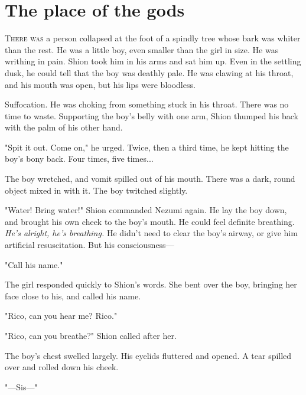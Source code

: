 
\chapter{The place of the gods}


\lettrine{T}{here was} a person collapsed at the foot of a spindly tree whose bark
was whiter than the rest. He was a little boy, even smaller than the
girl in size. He was writhing in pain. Shion took him in his arms and
sat him up. Even in the settling dusk, he could tell that the boy was
deathly pale. He was clawing at his throat, and his mouth was open, but
his lips were bloodless.

\myspace

Suffocation. He was choking from something stuck in his throat. There
was no time to waste. Supporting the boy's belly with one arm, Shion
thumped his back with the palm of his other hand.

"Spit it out. Come on," he urged. Twice, then a third time, he kept
hitting the boy's bony back. Four times, five times...

The boy wretched, and vomit spilled out of his mouth. There was a dark,
round object mixed in with it. The boy twitched slightly.

"Water! Bring water!" Shion commanded Nezumi again. He lay the boy down,
and brought his own cheek to the boy's mouth. He could feel definite
breathing. \emph{He's alright, he's breathing.} He didn't need to clear the
boy's airway, or give him artificial resuscitation. But his
consciousness---

"Call his name."

The girl responded quickly to Shion's words. She bent over the boy,
bringing her face close to his, and called his name.

"Rico, can you hear me? Rico."

"Rico, can you breathe?" Shion called after her.

The boy's chest swelled largely. His eyelids fluttered and opened. A
tear spilled over and rolled down his cheek.

"---Sis---"

